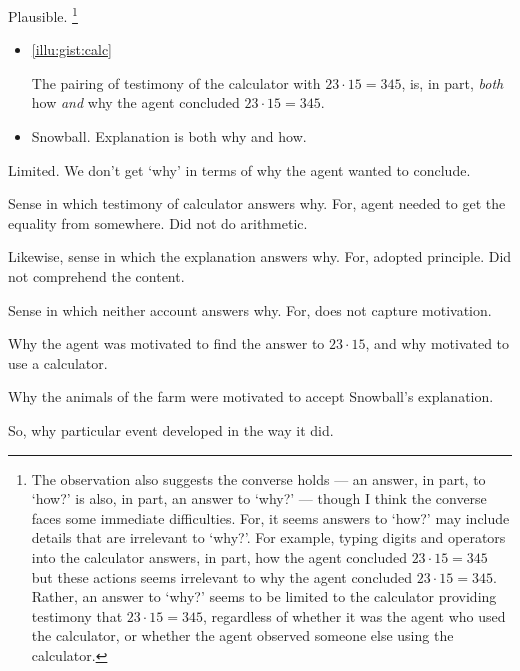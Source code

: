 \begin{note}
  Plausible.%
  \footnote{
    The observation also suggests the converse holds --- an answer, in part, to `how?' is also, in part, an answer to `why?' --- though I think the converse faces some immediate difficulties.
    For, it seems answers to `how?' may include details that are irrelevant to `why?'.
    For example, typing digits and operators into the calculator answers, in part, how the agent concluded \(23 \cdot 15 = 345\) but these actions seems irrelevant to why the agent concluded \(23 \cdot 15 = 345\).
    Rather, an answer to `why?' seems to be limited to the calculator providing testimony that \(23 \cdot 15 = 345\), regardless of whether it was the agent who used the calculator, or whether the agent observed someone else using the calculator.
  }

  \begin{itemize}
  \item
    \autoref{illu:gist:calc}

    The pairing of testimony of the calculator with \(23 \cdot 15 = 345\), is, in part, \emph{both} how \emph{and} why the agent concluded \(23 \cdot 15 = 345\).

  \item
    Snowball.
    Explanation is both why and how.
  \end{itemize}
\end{note}

\begin{note}
  Limited.
  We don't get `why' in terms of why the agent wanted to conclude.
\end{note}

\begin{note}
  Sense in which testimony of calculator answers why.
  For, agent needed to get the equality from somewhere.
  Did not do arithmetic.

  Likewise, sense in which the explanation answers why.
  For, adopted principle.
  Did not comprehend the content.

  Sense in which neither account answers why.
  For, does not capture motivation.

  Why the agent was motivated to find the answer to \(23 \cdot 15\), and why motivated to use a calculator.

  Why the animals of the farm were motivated to accept Snowball's explanation.

  So, why particular event developed in the way it did.
\end{note}


